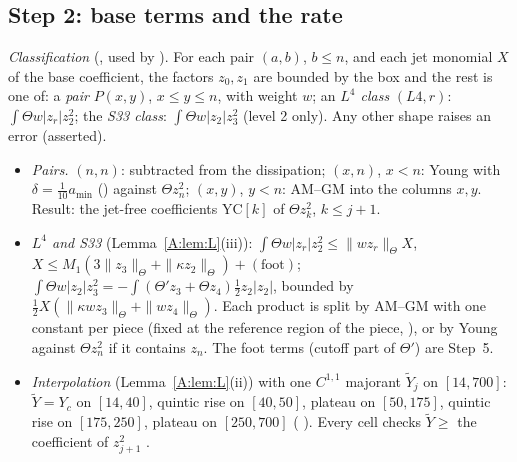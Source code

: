 \documentclass[11pt]{article}
\begin{document}
\subsection{Step 2: base terms and the rate}\label{A:sec:base}
\emph{Classification} (, used by  ). For each pair $(a,b)$, $b\le n$, and each jet monomial $X$ of the base coefficient, the factors $z_0,z_1$ are bounded by the box and the rest is one of: a \emph{pair} $P(x,y)$, $x\le y\le n$, with weight $w$; an \emph{$L^4$ class} $(L4,r)$: $\int\Theta w|z_r|z_2^2$; the \emph{S33 class}: $\int\Theta w|z_2|z_3^2$ (level 2 only). Any other shape raises an error (asserted).
\begin{itemize}[leftmargin=*]
\item \emph{Pairs.} $(n,n)$: subtracted from the dissipation; $(x,n)$, $x<n$: Young with $\delta=\frac1{10}a_{\min}$ () against $\Theta z_n^2$; $(x,y)$, $y<n$: AM--GM into the columns $x,y$. Result: the jet-free coefficients $\mathrm{YC}[k]$ of $\Theta z_k^2$, $k\le j+1$.
\item \emph{$L^4$ and S33} (Lemma~\ref{A:lem:L}(iii)): $\int\Theta w|z_r|z_2^2\le\|wz_r\|_\Theta X$, $X\le M_1(3\|z_3\|_\Theta+\|\kappa z_2\|_\Theta)+(\text{foot})$; $\int\Theta w|z_2|z_3^2=-\int(\Theta'z_3+\Theta z_4)\tfrac12z_2|z_2|$, bounded by $\frac12X(\|\kappa wz_3\|_\Theta+\|wz_4\|_\Theta)$. Each product is split by AM--GM with one constant per piece (fixed at the reference region of the piece, ), or by Young against $\Theta z_n^2$ if it contains $z_n$. The foot terms (cutoff part of $\Theta'$) are Step~5.
\item \emph{Interpolation} (Lemma~\ref{A:lem:L}(ii)) with one $C^{1,1}$ majorant $\tilde Y_j$ on $[14,700]$: $\tilde Y=Y_c$ on $[14,40]$, quintic rise on $[40,50]$, plateau on $[50,175]$, quintic rise on $[175,250]$, plateau on $[250,700]$ ( ). Every cell checks $\tilde Y\ge$ the coefficient of $z_{j+1}^2$ \tC.
\end{itemize}
\end{document}
